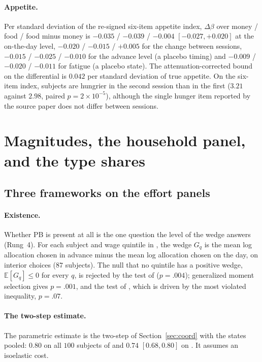 \documentclass[11pt,a4paper]{article}
\theoremstyle{plain}
\theoremstyle{definition}
\newcommand{\E}{\mathbb{E}}
\begin{document}
\paragraph{Appetite.} Per standard deviation of the re-signed six-item appetite index, $\Delta\beta$ over money /
food / food minus money is $-0.035$ / $-0.039$ / $-0.004$ $[-0.027,+0.020]$ at the on-the-day level, $-0.020$ /
$-0.015$ / $+0.005$ for the change between sessions, $-0.015$ / $-0.025$ / $-0.010$ for the advance level (a placebo
timing) and $-0.009$ / $-0.020$ / $-0.011$ for fatigue (a placebo state). The attenuation-corrected bound on the
differential is $0.042$ per standard deviation of true appetite. On the six-item index, subjects are hungrier in the
second session than in the first ($3.21$ against $2.98$, paired $p=2\times10^{-5}$), although the single hunger item
reported by the source paper does not differ between sessions.

\section{Magnitudes, the household panel, and the type shares}
\label{app:magn}

\subsection{Three frameworks on the effort panels}

\paragraph{Existence.} Whether PB is present at all is the one question the level of the wedge answers (Rung~4).
For each subject and wage quintile in \citet{augenblick2019}, the wedge $G_q$ is the mean log allocation chosen in
advance minus the mean log allocation chosen on the day, on interior choices ($87$ subjects). The null that no
quintile has a positive wedge, $\E[G_q]\le0$ for every $q$, is rejected by the test of \citet{coxshi2023}
($p=.004$); generalized moment selection gives $p=.001$, and the test of \citet{arp2023}, which is driven by the most
violated inequality, $p=.07$.

\paragraph{The two-step estimate.} The parametric estimate is the two-step of Section~\ref{sec:coord} with the states
pooled: $0.80$ on all $100$ subjects of \citet{augenblick2019} and $0.74$ $[0.68,0.80]$ on \citet{fedyk2024}. It
assumes an isoelastic cost.
\end{document}
